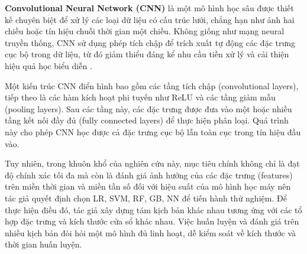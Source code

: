 \textbf{Convolutional Neural Network (CNN)} là một mô hình học sâu được 
thiết kế chuyên biệt để xử lý các loại dữ liệu có cấu trúc lưới, 
chẳng hạn như ảnh hai chiều hoặc tín hiệu chuỗi thời gian một chiều. 
Không giống như mạng neural truyền thống, CNN sử dụng phép tích chập 
để trích xuất tự động các đặc trưng cục bộ trong dữ liệu, từ đó giảm 
thiểu đáng kể nhu cầu tiền xử lý và cải thiện hiệu quả học biểu diễn 
\cite{lecun2015deep}.


Một kiến trúc CNN điển hình bao gồm các tầng tích chập 
(convolutional layers), tiếp theo là các hàm kích hoạt phi tuyến như 
ReLU và các tầng giảm mẫu (pooling layers). Sau các tầng này, các 
đặc trưng được đưa vào một hoặc nhiều tầng kết nối đầy đủ 
(fully connected layers) để thực hiện phân loại. 
Quá trình này cho phép CNN học được cả đặc trưng cục bộ lẫn 
toàn cục trong tín hiệu đầu vào.

Tuy nhiên, trong khuôn khổ của nghiên cứu này, mục tiêu chính không chỉ 
là đạt độ chính xác tối đa mà còn là đánh giá ảnh hưởng của các 
đặc trưng (features) trên miền thời gian và miền tần số đối với 
hiệu suất của mô hình học máy nên tác giả quyết định chọn LR, SVM, RF, GB, NN để tiến hành thử nghiệm. 
Để thực hiện điều đó, tác giả xây dựng 
tám kịch bản khác nhau tương ứng với các tổ hợp đặc trưng và 
kích thước cửa sổ khác nhau. Việc huấn luyện và đánh giá trên nhiều 
kịch bản đòi hỏi một mô hình đủ linh hoạt, dễ kiểm soát về kích thước 
và thời gian huấn luyện.




